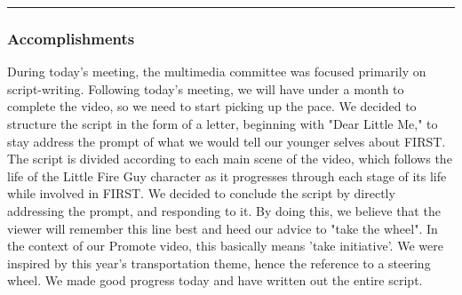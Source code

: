 \noindent\hfil\rule{\textwidth}{.4pt}\hfil

\subsubsection*{Accomplishments}
During today's meeting, the multimedia committee was focused primarily on script-writing. Following today's meeting, we will have under a month to complete the video, so we need to start picking up the pace. We decided to structure the script in the form of a letter, beginning with "Dear Little Me," to stay address the prompt of what we would tell our younger selves about FIRST. The script is divided according to each main scene of the video, which follows the life of the Little Fire Guy character as it progresses through each stage of its life while involved in FIRST. We decided to conclude the script by directly addressing the prompt, and responding to it. By doing this, we believe that the viewer will remember this line best and heed our advice to "take the wheel". In the context of our Promote video, this basically means 'take initiative'. We were inspired by this year's transportation theme, hence the reference to a steering wheel. We made good progress today and have written out the entire script.


